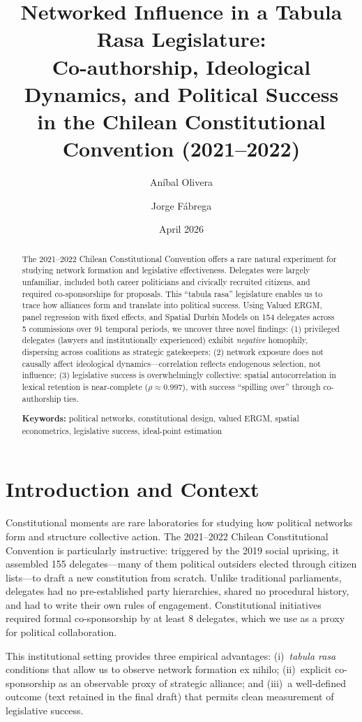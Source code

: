 \documentclass[11pt,a4paper]{article}
\title{\textbf{Networked Influence in a Tabula Rasa Legislature: \\
Co-authorship, Ideological Dynamics, and Political Success \\
in the Chilean Constitutional Convention (2021--2022)}}
\author[1]{An\'ibal Olivera}
\author[1]{Jorge F\'abrega}
\affil[1]{Centro de Investigaci\'on en Complejidad Social, \\
Universidad del Desarrollo, Santiago, Chile}
\date{April 2026}
\begin{document}
\maketitle

\begin{abstract}
\noindent The 2021--2022 Chilean Constitutional Convention offers a rare natural experiment for studying network formation and legislative effectiveness. Delegates were largely unfamiliar, included both career politicians and civically recruited citizens, and required co-sponsorships for proposals. This ``tabula rasa'' legislature enables us to trace how alliances form and translate into political success. Using Valued ERGM, panel regression with fixed effects, and Spatial Durbin Models on 154 delegates across 5 commissions over 91 temporal periods, we uncover three novel findings: (1) privileged delegates (lawyers and institutionally experienced) exhibit \emph{negative} homophily, dispersing across coalitions as strategic gatekeepers; (2) network exposure does not causally affect ideological dynamics---correlation reflects endogenous selection, not influence; (3) legislative success is overwhelmingly collective: spatial autocorrelation in lexical retention is near-complete ($\rho \approx 0.997$), with success ``spilling over'' through co-authorship ties.

\medskip
\noindent\textbf{Keywords:} political networks, constitutional design, valued ERGM, spatial econometrics, legislative success, ideal-point estimation
\end{abstract}

\section{Introduction and Context}

Constitutional moments are rare laboratories for studying how political networks form and structure collective action. The 2021--2022 Chilean Constitutional Convention is particularly instructive: triggered by the 2019 social uprising, it assembled 155 delegates---many of them political outsiders elected through citizen lists---to draft a new constitution from scratch. Unlike traditional parliaments, delegates had no pre-established party hierarchies, shared no procedural history, and had to write their own rules of engagement. Constitutional initiatives required formal co-sponsorship by at least 8 delegates, which we use as a proxy for political collaboration.

This institutional setting provides three empirical advantages: (i)~\emph{tabula rasa} conditions that allow us to observe network formation ex nihilo; (ii)~explicit co-sponsorship as an observable proxy of strategic alliance; and (iii)~a well-defined outcome (text retained in the final draft) that permits clean measurement of legislative success.
\end{document}
